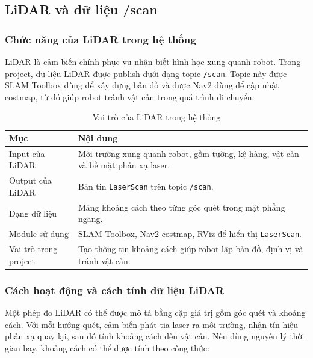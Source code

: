 \subsection{LiDAR và dữ liệu /scan}
\label{subsec:lidar-scan}

\subsubsection{Chức năng của LiDAR trong hệ thống}
\label{subsubsec:lidar-function}

LiDAR là cảm biến chính phục vụ nhận biết hình học xung quanh robot. Trong project, dữ liệu LiDAR được publish dưới dạng topic \texttt{/scan}. Topic này được SLAM Toolbox dùng để xây dựng bản đồ và được Nav2 dùng để cập nhật costmap, từ đó giúp robot tránh vật cản trong quá trình di chuyển.

\begin{table}[H]
    \centering
    \caption{Vai trò của LiDAR trong hệ thống}
    \label{tab:lidar-role}
    \renewcommand{\arraystretch}{1.25}
    \small
    \begin{tabularx}{\textwidth}{|>{\raggedright\arraybackslash}p{}|>{\raggedright\arraybackslash}X|}
        \hline
        \textbf{Mục} & \textbf{Nội dung} \\
        \hline
        Input của LiDAR & Môi trường xung quanh robot, gồm tường, kệ hàng, vật cản và bề mặt phản xạ laser. \\
        \hline
        Output của LiDAR & Bản tin \texttt{LaserScan} trên topic \texttt{/scan}. \\
        \hline
        Dạng dữ liệu & Mảng khoảng cách theo từng góc quét trong mặt phẳng ngang. \\
        \hline
        Module sử dụng & SLAM Toolbox, Nav2 costmap, RViz để hiển thị \texttt{LaserScan}. \\
        \hline
        Vai trò trong project & Tạo thông tin khoảng cách giúp robot lập bản đồ, định vị và tránh vật cản. \\
        \hline
    \end{tabularx}
\end{table}

\subsubsection{Cách hoạt động và cách tính dữ liệu LiDAR}
\label{subsubsec:lidar-calculation}

Một phép đo LiDAR có thể được mô tả bằng cặp giá trị gồm góc quét và khoảng cách. Với mỗi hướng quét, cảm biến phát tia laser ra môi trường, nhận tín hiệu phản xạ quay lại, sau đó tính khoảng cách đến vật cản. Nếu dùng nguyên lý thời gian bay, khoảng cách có thể được tính theo công thức:


